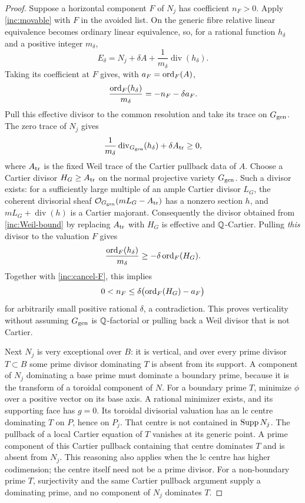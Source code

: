 \begin{proof}
Suppose a horizontal component $F$ of $N_j$ has coefficient $n_F>0$.
Apply \eqref{inc:movable} with $F$ in the avoided list.  On the generic
fibre relative linear equivalence becomes ordinary linear equivalence,
so, for a rational function $h_\delta$ and a positive integer
$m_\delta$,
\[
 E_\delta=N_j+\delta A+
       \frac{1}{m_\delta}\operatorname{div}(h_\delta).
\]
Taking its coefficient at $F$ gives, with $a_F=\operatorname{ord}_F(A)$,
\begin{equation}\label{inc:cancel-F}
 \frac{\operatorname{ord}_F(h_\delta)}{m_\delta}=-n_F-\delta a_F.
\end{equation}
Pull this effective divisor to the common resolution and take its
trace on $G_{\rm gen}$.  The zero trace of $N_j$ gives
\begin{equation}\label{inc:Weil-bound}
 \frac{1}{m_\delta}\operatorname{div}_{G_{\rm gen}}(h_\delta)
       +\delta A_{\rm tr}\geq0,
\end{equation}
where $A_{\rm tr}$ is the fixed Weil trace of the Cartier pullback
data of $A$.  Choose a Cartier divisor $H_G\geq A_{\rm tr}$ on the
normal projective variety $G_{\rm gen}$.  Such a divisor exists:
for a sufficiently large multiple of an ample Cartier divisor $L_G$,
the coherent divisorial sheaf $\mathcal O_{G_{\rm gen}}(mL_G-A_{\rm tr})$
has a nonzero section $h$, and $mL_G+\operatorname{div}(h)$ is a
Cartier majorant.  Consequently the divisor obtained from
\eqref{inc:Weil-bound} by replacing $A_{\rm tr}$ with $H_G$ is
effective and $\mathbb Q$-Cartier.  Pulling \emph{this} divisor to the
valuation $F$ gives
\[
 \frac{\operatorname{ord}_F(h_\delta)}{m_\delta}
       \geq-\delta\operatorname{ord}_F(H_G).
\]
Together with \eqref{inc:cancel-F}, this implies
\[
 0<n_F\leq\delta\bigl(\operatorname{ord}_F(H_G)-a_F\bigr)
\]
for arbitrarily small positive rational $\delta$, a contradiction.
This proves verticality without assuming $G_{\rm gen}$ is
$\mathbb Q$-factorial or pulling back a Weil divisor that is not Cartier.

Next $N_j$ is very exceptional over $B$: it is vertical, and over
every prime divisor $T\subset B$ some prime divisor dominating $T$
is absent from its support.  A component of $N_j$ dominating a base
prime must dominate a boundary prime, because it is the transform of
a toroidal component of $N$.  For a boundary prime $T$, minimize
$\phi$ over a positive vector on its base axis.  A rational minimizer
exists, and its supporting face has $g=0$.  Its toroidal divisorial
valuation has an lc centre dominating $T$ on $P$, hence on $P_j$.
That centre is not contained in $\operatorname{Supp} N_j$.  The pullback of a local
Cartier equation of $T$ vanishes at its generic point.  A prime
component of this Cartier pullback containing that centre dominates
$T$ and is absent from $N_j$.  This reasoning also applies when
the lc centre has higher codimension; the centre itself need not
be a prime divisor.  For a non-boundary prime $T$, surjectivity and
the same Cartier pullback argument supply a dominating prime, and
no component of $N_j$ dominates $T$.


\end{proof}
